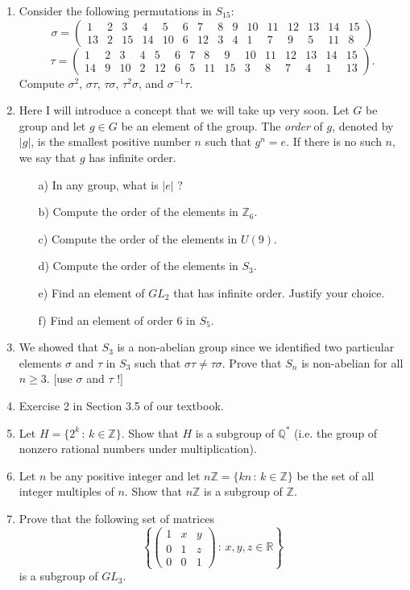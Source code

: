 \documentclass[11pt]{article}
\theoremstyle{definition}  %
\newcommand{\Z}{\mathbb{Z}}
\newcommand{\Q}{\mathbb{Q}}
\newcommand{\R}{\mathbb{R}}
\begin{document}

\begin{enumerate}

\item Consider the following permutations in $S_{15}$:
  $$ \sigma = \left( \begin{array}{ccccccccccccccc} 1 & 2 & 3 & 4 & 5 & 6 & 7 & 8 & 9 & 10 & 11 & 12 & 13 & 14 & 15 \\
                       13& 2 &15&14&10& 6 &12& 3 & 4 &   1 &   7 &   9 &   5 & 11 &   8 \end{array} \right) $$
  $$      \tau = \left( \begin{array}{ccccccccccccccc} 1 & 2 & 3 & 4 & 5 & 6 & 7 & 8 & 9 & 10 & 11 & 12 & 13 & 14 & 15 \\
                        14& 9 &10& 2 &12 & 6 & 5 & 11 & 15 &   3 &   8 &   7 &   4 & 1 &   13 \end{array} \right). $$
Compute $\sigma^2$, $\sigma \tau$, $\tau \sigma$, $\tau^2\sigma$, and $\sigma^{-1} \tau$. 
\item Here I will introduce a concept that we will take up very soon. Let $G$ be  group and let $g \in G$ be an element of the group. The {\it order} of $g$, denoted by $|g|$,
  is the smallest positive number $n$ such that $g^n = e$. If there is no such $n$, we say that $g$ has infinite order.
  \begin{itemize}
     \item[a)] In any group, what is $|e|$ ?
     \item[b)] Compute the order of the elements in $\Z_6$.
     \item[c)] Compute the order of the elements in $U(9)$.
     \item[d)] Compute the order of the elements in $S_3$.
     \item[e)] Find an element of $GL_2$ that has infinite order. Justify your choice.
      \item[f)] Find an element of order $6$ in $S_5$. 
  \end{itemize}
\item We showed that $S_3$ is a non-abelian group since we identified two particular elements $\sigma$ and $\tau$ in $S_3$ such that $\sigma \tau \neq \tau \sigma$.
 Prove that $S_n$ is non-abelian for all $n\geq 3$. [use $\sigma$ and $\tau$ !]
\item Exercise 2 in Section 3.5 of our textbook. 
\item Let $H = \{ 2^k \, :\, k \in \Z\}$. Show that $H$ is a subgroup of $\Q^*$ (i.e. the group of nonzero rational numbers under multiplication).
\item Let $n$ be any positive integer and let $n\Z = \{kn \, : \, k \in \Z\}$ be the set of all integer multiples of $n$. Show that $n\Z$ is a subgroup of $\Z$.
\item Prove that the following set of matrices
  $$ \left\{ \left( \begin{array}{ccc} 1 & x & y \\ 0 & 1 & z  \\ 0 & 0 & 1 \end{array} \right) \, : \,  x, y, z \in \R \right\} $$
  is a subgroup of $GL_3$. 


 \end{enumerate}
\end{document}
